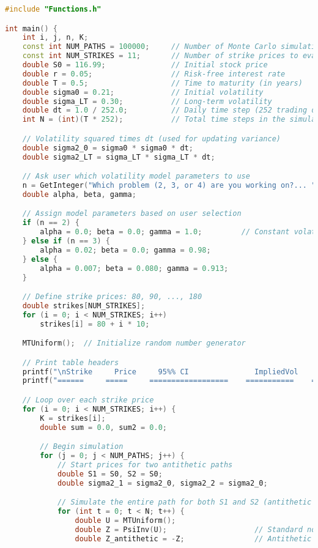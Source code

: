 \documentclass{report}
\begin{document}
\begin{lstlisting}[language=C++]
#include "Functions.h"

int main() {
    int i, j, n, K;
    const int NUM_PATHS = 100000;     // Number of Monte Carlo simulations
    const int NUM_STRIKES = 11;       // Number of strike prices to evaluate
    double S0 = 116.99;               // Initial stock price
    double r = 0.05;                  // Risk-free interest rate
    double T = 0.5;                   // Time to maturity (in years)
    double sigma0 = 0.21;             // Initial volatility
    double sigma_LT = 0.30;           // Long-term volatility
    double dt = 1.0 / 252.0;          // Daily time step (252 trading days/year)
    int N = (int)(T * 252);           // Total time steps in the simulation

    // Volatility squared times dt (used for updating variance)
    double sigma2_0 = sigma0 * sigma0 * dt;
    double sigma2_LT = sigma_LT * sigma_LT * dt;

    // Ask user which volatility model parameters to use
    n = GetInteger("Which problem (2, 3, or 4) are you working on?... ");
    double alpha, beta, gamma;

    // Assign model parameters based on user selection
    if (n == 2) {
        alpha = 0.0; beta = 0.0; gamma = 1.0;         // Constant volatility
    } else if (n == 3) {
        alpha = 0.02; beta = 0.0; gamma = 0.98;       
    } else {
        alpha = 0.007; beta = 0.080; gamma = 0.913;   
    }

    // Define strike prices: 80, 90, ..., 180
    double strikes[NUM_STRIKES];
    for (i = 0; i < NUM_STRIKES; i++)
        strikes[i] = 80 + i * 10;

    MTUniform();  // Initialize random number generator

    // Print table headers
    printf("\nStrike     Price     95%% CI               ImpliedVol     LowerCI     UpperCI\n");
    printf("======     =====     ==================    ===========    ========    ========\n");

    // Loop over each strike price
    for (i = 0; i < NUM_STRIKES; i++) {
        K = strikes[i];
        double sum = 0.0, sum2 = 0.0;

        // Begin simulation
        for (j = 0; j < NUM_PATHS; j++) {
            // Start prices for two antithetic paths
            double S1 = S0, S2 = S0;                     
            double sigma2_1 = sigma2_0, sigma2_2 = sigma2_0;

            // Simulate the entire path for both S1 and S2 (antithetic variates)
            for (int t = 0; t < N; t++) {
                double U = MTUniform();
                double Z = PsiInv(U);                    // Standard normal variable
                double Z_antithetic = -Z;                // Antithetic counterpart


\end{lstlisting}
\end{document}
